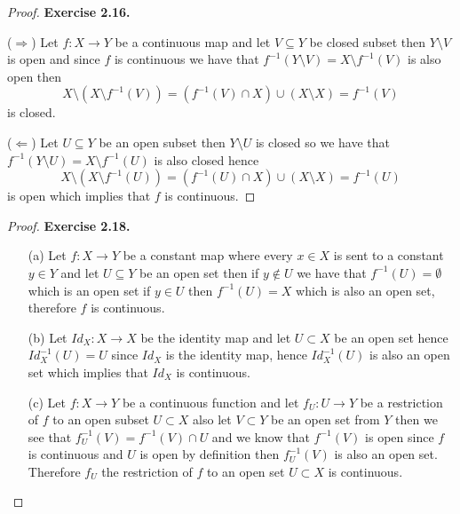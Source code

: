 \documentclass[11pt]{article}
\newcommand{\setmin}{\setminus}
\theoremstyle{definition}
\begin{document}
\begin{proof}{\textbf{Exercise 2.16.}}
    
    ($\Rightarrow$)
    Let $f:X \to Y$ be a continuous map and let $V \subseteq Y$ be closed
    subset then $Y \setmin V$ is open and since $f$ is continuous we have that
    $f^{-1}(Y \setmin V) = X \setmin f^{-1}(V)$ is also open then
    $$X \setmin (X\setmin f^{-1}(V))
    = (f^{-1}(V) \cap X) \cup (X \setmin X)
    = f^{-1}(V)$$
    is closed.

    ($\Leftarrow$)
    Let $U \subseteq Y$ be an open subset then $Y \setmin U$ is closed so we
    have that $f^{-1}(Y \setmin U) = X \setmin f^{-1}(U)$ is also closed hence
    $$X \setmin (X\setmin f^{-1}(U))
    = (f^{-1}(U) \cap X) \cup (X \setmin X)
    = f^{-1}(U)$$
    is open which implies that $f$ is continuous.
\end{proof}
\begin{proof}{\textbf{Exercise 2.18.}}
    \begin{itemize}
    \item [(a)] Let $f: X \to Y$ be a constant map where every $x \in X$ is
    sent to a constant $y \in Y$ and let $U \subseteq Y$ be an open set then
    if $y \not \in U$ we have that $f^{-1}(U) = \emptyset$ which is an open set
    if $y \in U$ then $f^{-1}(U) = X$ which is also an open set, therefore $f$
    is continuous.

    \item [(b)] Let ${Id}_X: X \to X$ be the identity map and let
    $U \subset X$ be an open set hence $Id_X^{-1}(U) = U$ since $Id_X$ is the
    identity map, hence $Id_X^{-1}(U)$ is also an open set which implies that
    $Id_X$ is continuous.

    \item [(c)] Let $f:X \to Y$ be a continuous function and let
    $f_U: U \to Y$ be a restriction of $f$ to an open subset $U \subset X$ also
    let $V \subset Y$ be an open set from $Y$ then we see that
    $f_U^{-1}(V) = f^{-1}(V) \cap U$ and we know that $f^{-1}(V)$ is open since
    $f$ is continuous and $U$ is open by definition then $f^{-1}_U(V)$ is also
    an open set.
    Therefore $f_U$ the restriction of $f$ to an open set $U \subset X$ is
    continuous.
    \end{itemize}
\end{proof}
\cleardoublepage
\end{document}
